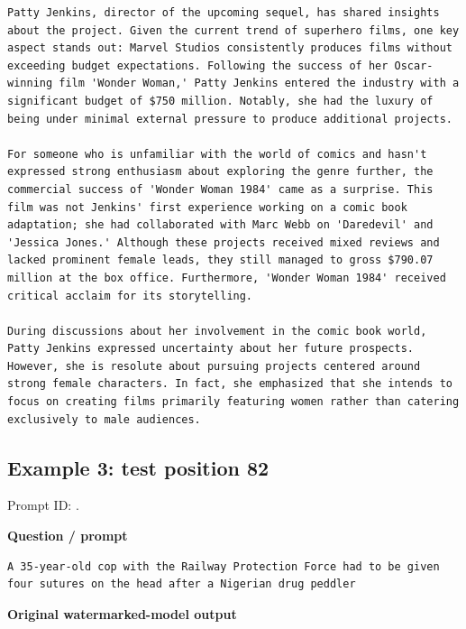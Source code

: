 \begin{Verbatim}
Patty Jenkins, director of the upcoming sequel, has shared insights about the project. Given the current trend of superhero films, one key aspect stands out: Marvel Studios consistently produces films without exceeding budget expectations. Following the success of her Oscar-winning film 'Wonder Woman,' Patty Jenkins entered the industry with a significant budget of $750 million. Notably, she had the luxury of being under minimal external pressure to produce additional projects. 

For someone who is unfamiliar with the world of comics and hasn't expressed strong enthusiasm about exploring the genre further, the commercial success of 'Wonder Woman 1984' came as a surprise. This film was not Jenkins' first experience working on a comic book adaptation; she had collaborated with Marc Webb on 'Daredevil' and 'Jessica Jones.' Although these projects received mixed reviews and lacked prominent female leads, they still managed to gross $790.07 million at the box office. Furthermore, 'Wonder Woman 1984' received critical acclaim for its storytelling.

During discussions about her involvement in the comic book world, Patty Jenkins expressed uncertainty about her future prospects. However, she is resolute about pursuing projects centered around strong female characters. In fact, she emphasized that she intends to focus on creating films primarily featuring women rather than catering exclusively to male audiences.
\end{Verbatim}

\subsection{Example 3: test position
82}\label{record-docs-watermarking-qualitative-paper-sir-bira-md-example-3-test-position-82}

Prompt ID:
\texttt{}.

\textbf{Question / prompt}

\begin{Verbatim}
A 35-year-old cop with the Railway Protection Force had to be given four sutures on the head after a Nigerian drug peddler
\end{Verbatim}

\textbf{Original watermarked-model output}

